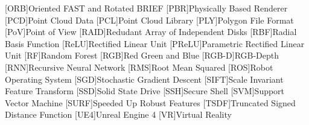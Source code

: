 \begin{acronym}
    [ORB]{Oriented FAST and Rotated BRIEF}
    [PBR]{Physically Based Renderer}
	[PCD]{Point Cloud Data}
    [PCL]{Point Cloud Library}
    [PLY]{Polygon File Format}
	[PoV]{Point of View}
	[RAID]{Redudant Array of Independent Disks}
	[RBF]{Radial Basis Function}
	[ReLU]{Rectified Linear Unit}
    [PReLU]{Parametric Rectified Linear Unit}
    [RF]{Random Forest}
	[RGB]{Red Green and Blue}
    [RGB-D]{RGB-Depth}
	[RNN]{Recursive Neural Network}
    [RMS]{Root Mean Squared}
    [ROS]{Robot Operating System}
	[SGD]{Stochastic Gradient Descent}
	[SIFT]{Scale Invariant Feature Transform}
	[SSD]{Solid State Drive}
	[SSH]{Secure Shell}
	[SVM]{Support Vector Machine}
	[SURF]{Speeded Up Robust Features}
    [TSDF]{Truncated Signed Distance Function}
    [UE4]{Unreal Engine 4}
    [VR]{Virtual Reality}
\end{acronym}
